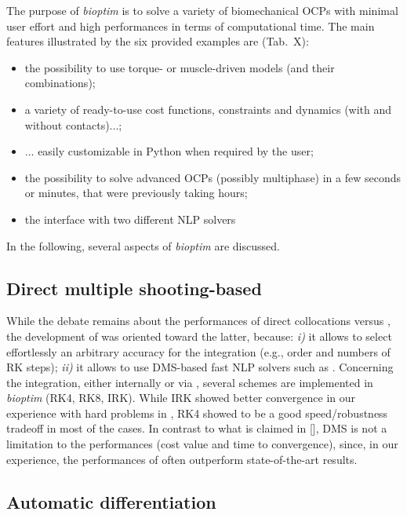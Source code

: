 The purpose of \textit{bioptim} is to solve a variety of biomechanical OCPs with minimal user effort and high performances in terms of computational time. 
The main features illustrated by the six provided examples are (Tab.~X): 
\begin{itemize}
\item the possibility to use torque- or muscle-driven models (and their combinations);
\item a variety of ready-to-use cost functions, constraints and dynamics (with and without contacts)...;
\item ... easily customizable in Python when required by the user;
\item the possibility to solve advanced OCPs (possibly multiphase) in a few seconds or minutes, that were previously taking hours;
\item the interface with two different NLP solvers
\end{itemize}
In the following, several aspects of \textit{bioptim} are discussed.


\subsection{Direct multiple shooting-based}

While the debate remains about the performances of direct collocations versus  \cite{diehl2006fast}, the development of \bioptim was oriented toward the latter, because: \textit{i)} it allows to select effortlessly an arbitrary accuracy for the integration (e.g., order and numbers of RK steps); \textit{ii)} it allows to use DMS-based fast NLP solvers such as \acados.
Concerning the integration, either internally or via \acados, several schemes are implemented in \textit{bioptim} (RK4, RK8, IRK).
While IRK showed better convergence in our experience with hard problems in \acados, RK4 showed to be a good speed/robustness tradeoff in most of the cases. 
In contrast to what is claimed in [\addref], DMS is not a limitation to the performances (cost value and time to convergence), since, in our experience, the performances of \bioptim often outperform state-of-the-art results.

\subsection{Automatic differentiation}

